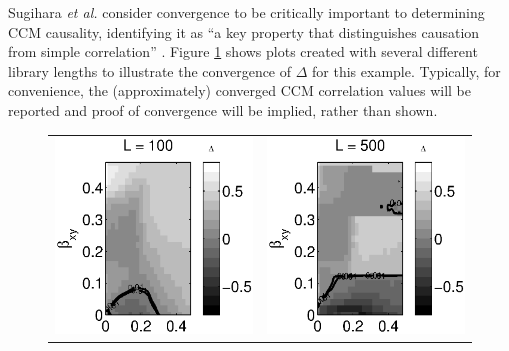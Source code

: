 \documentclass[a4paper,11pt]{article}
\begin{document}
Sugihara {\em et al. }consider convergence to be critically important to determining CCM causality, identifying it as ``a key property that distinguishes causation from simple correlation'' \cite{Sugihara2012}.  Figure \ref{fig:} shows plots created with several different library lengths to illustrate the convergence of $\Delta$ for this example.  Typically, for convenience, the (approximately) converged CCM correlation values will be reported and proof of convergence will be implied, rather than shown.
\begin{figure}[ht]
\label{fig:}
\begin{tabular}{cc}
\includegraphics[scale=0.9]{Figure1A.eps} & \includegraphics[scale=0.9]{Figure1B.eps}\\

\end{tabular}
\end{figure}
\end{document}
